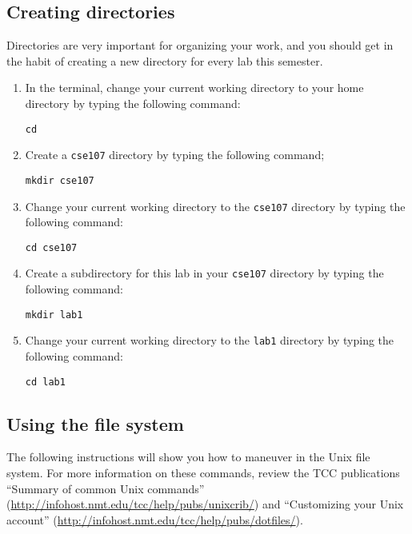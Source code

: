 \documentclass[12pt,hidelinks]{article}
\begin{document}
\begin{appendices}
\subsection{Creating directories}
Directories are very important for organizing your work, and you should get in the habit of creating a new directory for every lab this semester.

\begin{enumerate}

\item In the terminal, change your current working directory to your home directory by typing the following command:
\begin{lstlisting}[style=bash]
cd
\end{lstlisting}

\item Create a \texttt{cse107} directory by typing the following command;
\begin{lstlisting}[style=bash]
mkdir cse107
\end{lstlisting}

\item Change your current working directory to the \texttt{cse107} directory by typing the following command:
\begin{lstlisting}[style=bash]
cd cse107
\end{lstlisting}

\item Create a subdirectory for this lab in your \texttt{cse107} directory by typing the following command:
\begin{lstlisting}[style=bash]
mkdir lab1
\end{lstlisting}

\item Change your current working directory to the \texttt{lab1} directory by typing the following command:
\begin{lstlisting}[style=bash]
cd lab1
\end{lstlisting}

\end{enumerate}



\subsection{Using the file system}
The following instructions will show you how to maneuver in the Unix file system. For more information on these commands, review the TCC publications ``Summary of common Unix commands'' (\url{http://infohost.nmt.edu/tcc/help/pubs/unixcrib/}) and ``Customizing your Unix account'' (\url{http://infohost.nmt.edu/tcc/help/pubs/dotfiles/}).


\end{appendices}
\end{document}
